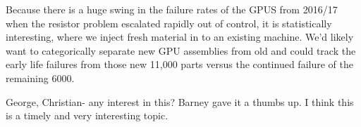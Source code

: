 Because there is a huge swing in the failure rates of the GPUS from
2016/17 when the resistor problem escalated rapidly out of control, it
is statistically interesting, where we inject fresh material in to an
existing machine. We’d likely want to categorically separate new GPU
assemblies from old and could track the early life failures from those
new 11,000 parts versus the continued failure of the remaining 6000. 
 
George, Christian-  any interest in this? Barney gave it a thumbs
up. I think this is a timely and very interesting topic. 
